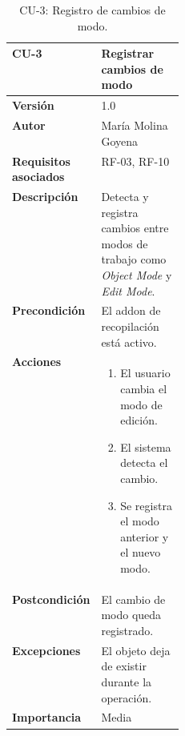 \begin{table}[p]
\centering
\begin{tabularx}{\linewidth}{p{0.25\linewidth} X}
\toprule
\textbf{CU-3} & Registrar cambios de modo \\
\midrule
\textbf{Versión} & 1.0 \\
\textbf{Autor} & María Molina Goyena \\
\textbf{Requisitos asociados} & RF-03, RF-10 \\
\textbf{Descripción} & Detecta y registra cambios entre modos de trabajo como \textit{Object Mode} y \textit{Edit Mode}. \\
\textbf{Precondición} & El addon de recopilación está activo. \\
\textbf{Acciones} &
\begin{minipage}[t]{\linewidth}
\begin{enumerate}
    \item El usuario cambia el modo de edición.
    \item El sistema detecta el cambio.
    \item Se registra el modo anterior y el nuevo modo.
\end{enumerate}
\end{minipage} \\
\textbf{Postcondición} & El cambio de modo queda registrado. \\
\textbf{Excepciones} & El objeto deja de existir durante la operación. \\
\textbf{Importancia} & Media \\
\bottomrule
\end{tabularx}
\caption{CU-3: Registro de cambios de modo.}
\label{tab:cu3}
\end{table}

